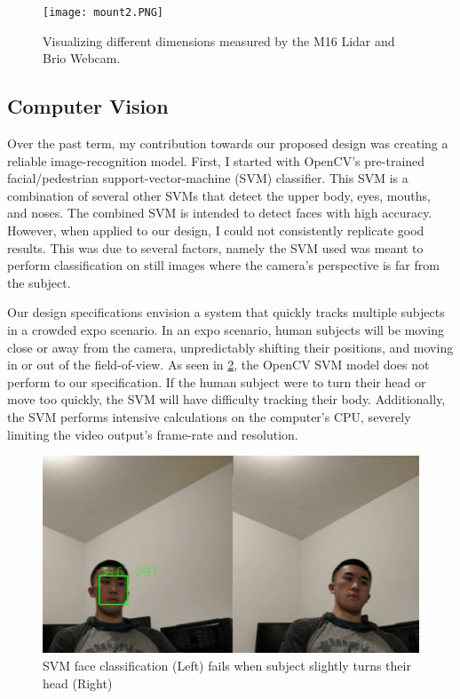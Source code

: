 \documentclass[onecolumn, draftclsnofoot,10pt, compsoc]{IEEEtran}
\makeatletter
\newcommand\captionof[1]{\def\@captype{#1}\caption}
\makeatother
\begin{document}
\begin{singlespace}
			\begin{figure}[H]
				\texttt{[image: mount2.PNG]}
				\captionof{figure}{Visualizing different dimensions measured by the M16 Lidar and Brio Webcam.}
				\label{mount2}
			\end{figure}


		\subsection{Computer Vision}
			Over the past term, my contribution towards our proposed design was creating a reliable image-recognition model.
			First, I started with OpenCV's pre-trained facial/pedestrian support-vector-machine (SVM) classifier.
			This SVM is a combination of several other SVMs that detect the upper body, eyes, mouths, and noses.
			The combined SVM is intended to detect faces with high accuracy.
			However, when applied to our design, I could not consistently replicate good results.
			This was due to several factors, namely the SVM used was meant to perform classification on still images where the camera's perspective is far from the subject.
			

			Our design specifications envision a system that quickly tracks multiple subjects in a crowded expo scenario.
			In an expo scenario, human subjects will be moving close or away from the camera, unpredictably shifting their positions, and moving in or out of the field-of-view.
			As seen in \ref{svm}, the OpenCV SVM model does not perform to our specification.
			If the human subject were to turn their head or move too quickly, the SVM will have difficulty tracking their body.
			Additionally, the SVM performs intensive calculations on the computer's CPU, severely limiting the video output's frame-rate and resolution.
			\begin{figure}[H]
			\includegraphics[scale=0.75]{svm.PNG}
			\captionof{figure}{SVM face classification (Left) fails when subject slightly turns their head (Right)}
			\label{svm}
			\end{figure}



\end{singlespace}
\end{document}
